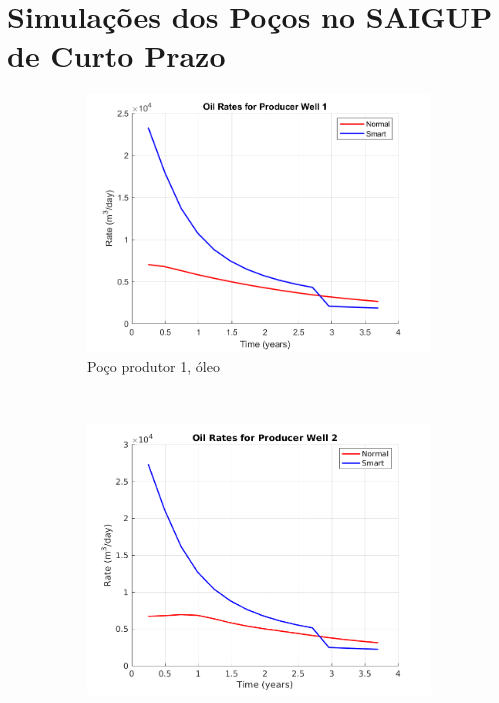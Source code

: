 \chapter{Simula\c{c}\~{o}es dos Po\c{c}os no SAIGUP de Curto Prazo}\label{apn:sSAIGUP}
\begin{figure}[!ht]
	\centering
	\begin{subfigure}[b]{.3\textwidth}
		\includegraphics[width=\textwidth]{figs/resultadosSSAIGUP/SSAIGUP_OilWell1_Zoom}
		\caption{Po\c{c}o produtor 1, \'{o}leo}
		\label{SSAIGUP_OilWell1}
	\end{subfigure}
	~
	\begin{subfigure}[b]{.3\textwidth}
		\includegraphics[width=\textwidth]{figs/resultadosSSAIGUP/SSAIGUP_OilWell2_Zoom}

\end{subfigure}
\end{figure}
